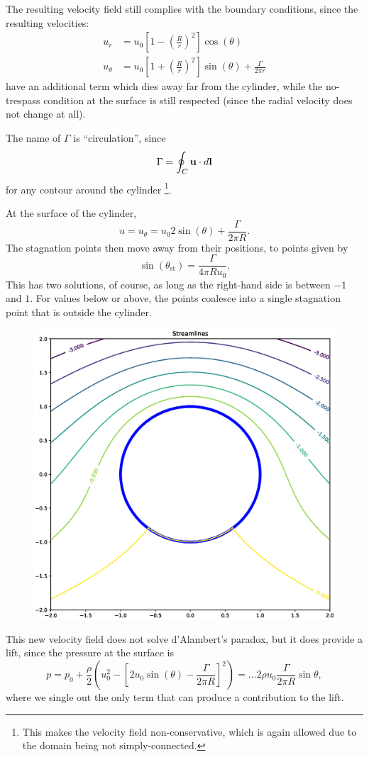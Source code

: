 The resulting velocity field still complies with the boundary
conditions, since the resulting velocities:
\begin{align}
u_r     &=   u_0  \left[ 1 - \left( \frac{R}{r}\right)^2 \right] \cos(\theta) \\
\label{eq:u_theta_cyl_pot_circ}
u_\theta &=   u_0  \left[ 1 + \left( \frac{R}{r}\right)^2 \right] \sin(\theta) +\frac{\Gamma}{2\pi r} 
\end{align}
have an additional term which dies away far from the cylinder, while
the no-trespass condition at the surface is still respected (since the
radial velocity does not change at all).

The name of $\Gamma$ is ``circulation'', since
\[
\Gamma = \oint_C \mathbf{u}\cdot d\mathbf{l}
\]
for any contour around the cylinder \footnote{This makes the velocity
  field non-conservative, which is again allowed due to the domain
  being not simply-connected.}.

At the surface of the cylinder,
\[
u= u_\theta =   u_0  2 \sin(\theta) +\frac{\Gamma}{2\pi R} .
\]
The stagnation points then move away from their positions, to points given by
\[
\sin(\theta_\mathrm{st})  = \frac{\Gamma}{4\pi R u_0} .
\]
This has two solutions, of course, as long as the right-hand side is
between $-1$ and $1$. For values below or above, the points coalesce
into a single stagnation point that is outside the cylinder.

\begin{figure}
  \centering
  \includegraphics[width=0.4\linewidth]{figures/potential_flow_past_cylinder_rotating}
  \caption{\label{fig:}}
\end{figure}


This new velocity field does not solve d'Alambert's paradox, but it
does provide a lift, since the pressure at the surface is
\[
p= p_0 + \frac{\rho}2   \left(u_0^2 -  \left[ 2  u_0 \sin(\theta) - \frac{\Gamma}{2\pi R} \right]^2 \right) =
\ldots  2 \rho u_0   \frac{\Gamma}{2\pi R} \sin\theta ,
\]
where we single out the only term that can produce a contribution to the lift.

